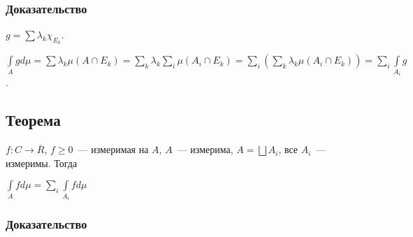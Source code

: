 \documentclass{article}
\begin{document}
        \subsubsection{Доказательство}
        
            $g = \sum \lambda_k \chi_{E_k}$.
            
            $\int\limits_A g d \mu = \sum \lambda_k \mu (A \cap E_k) = \sum\limits_{k} \lambda_k \sum\limits_{i} \mu (A_i \cap E_k) = \sum\limits_i \left( \sum\limits_k \lambda_k \mu (A_i \cap E_k ) \right) = \sum\limits_i \int\limits_{A_i} g$.
            
    \subsection{Теорема}
    
        $f : C \rightarrow \overline{R}$, $f \geqslant 0$~--- измеримая на $A$, $A$~--- измерима, $A = \bigsqcup A_i$, все $A_i$~--- измеримы. Тогда
        
        $\int\limits_{A} f d \mu = \sum\limits_{i} \int\limits_{A_i} f d \mu$
            
        \subsubsection{Доказательство}
        
\end{document}
